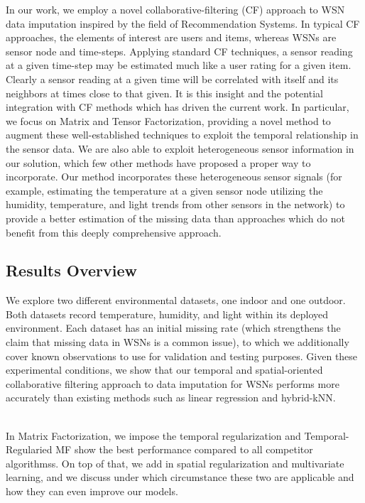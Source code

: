In our work, we employ a novel collaborative-filtering (CF) approach to WSN data imputation inspired by the field of Recommendation Systems.
In typical CF approaches, the elements of interest are users and items, whereas WSNs are sensor node and time-steps.
Applying standard CF techniques, a sensor reading at a given time-step may be estimated much like a user rating for a given item.
Clearly a sensor reading at a given time will be correlated with itself and its neighbors at times close to that given.
It is this insight and the potential integration with CF methods which has driven the current work.
In particular, we focus on Matrix and Tensor Factorization, providing a novel method to augment these well-established techniques to exploit the temporal relationship in the sensor data.
We are also able to exploit heterogeneous sensor information in our solution, which few other methods have proposed a proper way to incorporate.
Our method incorporates these heterogeneous sensor signals (for example, estimating the temperature at a given sensor node utilizing the humidity, temperature, and light trends from other sensors in the network) to provide a better estimation of the missing data than approaches which do not benefit from this deeply comprehensive approach.

\subsection{Results Overview }
We explore two different environmental datasets, one indoor and one outdoor.
Both datasets record temperature, humidity, and light within its deployed environment.
Each dataset has an initial missing rate (which strengthens the claim that missing data in WSNs is a common issue), to which we additionally cover known observations to use for validation and testing purposes.
Given these experimental conditions, we show that our temporal and spatial-oriented collaborative filtering approach to data imputation for WSNs performs more accurately than existing methods such as linear regression and hybrid-kNN.

\\
In Matrix Factorization, we impose the temporal regularization and Temporal-Regularied MF show the best performance compared to all competitor algorithmss.
On top of that, we add in spatial regularization and multivariate learning, and we discuss under which circumstance these two are applicable and how they can even improve our models.

